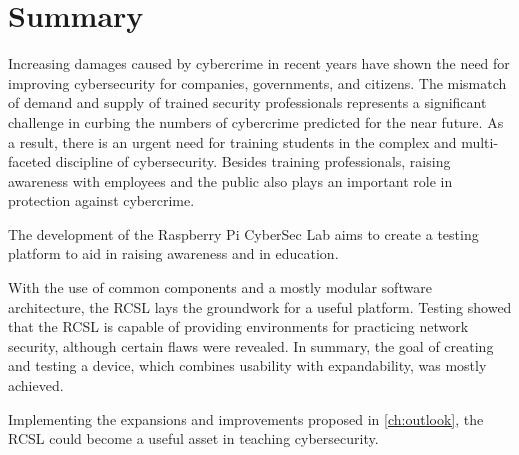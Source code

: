 \chapter{Summary}\label{ch:summary}
Increasing damages caused by cybercrime in recent years have shown the need for improving cybersecurity for companies, governments, and citizens.
The mismatch of demand and supply of trained security professionals represents a significant challenge in curbing the numbers of cybercrime predicted for the near future.
As a result, there is an urgent need for training students in the complex and multi-faceted discipline of cybersecurity.
Besides training professionals, raising awareness with employees and the public also plays an important role in protection against cybercrime.

The development of the Raspberry Pi CyberSec Lab aims to create a testing platform to aid in raising awareness and in education.

With the use of common components and a mostly modular software architecture, the RCSL lays the groundwork for a useful platform.
Testing showed that the RCSL is capable of providing environments for practicing network security, although certain flaws were revealed.
In summary, the goal of creating and testing a device, which combines usability with expandability, was mostly achieved.

Implementing the expansions and improvements proposed in \cref{ch:outlook}, the RCSL could become a useful asset in teaching cybersecurity.